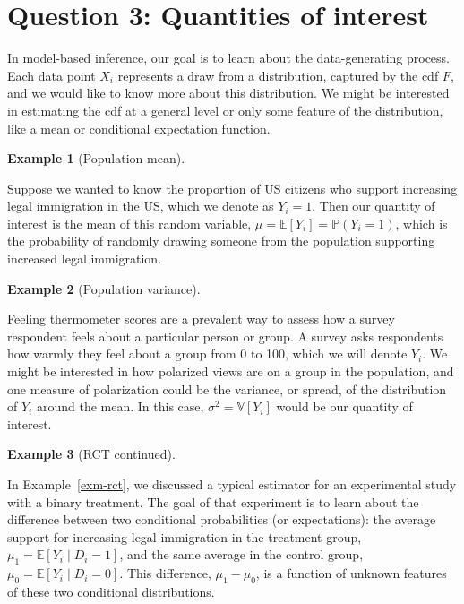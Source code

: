\documentclass[
  letterpaper,
  DIV=11,
  numbers=noendperiod]{scrreprt}
\newcommand{\E}{\mathbb{E}}
\newcommand{\V}{\mathbb{V}}
\renewcommand{\P}{\mathbb{P}}
\theoremstyle{definition}
\newtheorem{example}{Example}[chapter]
\theoremstyle{definition}
\theoremstyle{plain}
\theoremstyle{remark}
\begin{document}
\hypertarget{question-3-quantities-of-interest}{%
\section{Question 3: Quantities of
interest}\label{question-3-quantities-of-interest}}

In model-based inference, our goal is to learn about the data-generating
process. Each data point \(X_i\) represents a draw from a distribution,
captured by the cdf \(F\), and we would like to know more about this
distribution. We might be interested in estimating the cdf at a general
level or only some feature of the distribution, like a mean or
conditional expectation function.

\begin{example}[Population
mean]\protect\hypertarget{exm-prop}{}\label{exm-prop}

Suppose we wanted to know the proportion of US citizens who support
increasing legal immigration in the US, which we denote as \(Y_i = 1\).
Then our quantity of interest is the mean of this random variable,
\(\mu = \E[Y_i] = \P(Y_{i} = 1)\), which is the probability of randomly
drawing someone from the population supporting increased legal
immigration.

\end{example}

\begin{example}[Population
variance]\protect\hypertarget{exm-var}{}\label{exm-var}

Feeling thermometer scores are a prevalent way to assess how a survey
respondent feels about a particular person or group. A survey asks
respondents how warmly they feel about a group from 0 to 100, which we
will denote \(Y_i\). We might be interested in how polarized views are
on a group in the population, and one measure of polarization could be
the variance, or spread, of the distribution of \(Y_i\) around the mean.
In this case, \(\sigma^2 = \V[Y_i]\) would be our quantity of interest.

\end{example}

\begin{example}[RCT
continued]\protect\hypertarget{exm-rct-ii}{}\label{exm-rct-ii}

In Example~\ref{exm-rct}, we discussed a typical estimator for an
experimental study with a binary treatment. The goal of that experiment
is to learn about the difference between two conditional probabilities
(or expectations): the average support for increasing legal immigration
in the treatment group, \(\mu_1 = \E[Y_i \mid D_i = 1]\), and the same
average in the control group, \(\mu_0 = \E[Y_i \mid D_i = 0]\). This
difference, \(\mu_1 - \mu_0\), is a function of unknown features of
these two conditional distributions.

\end{example}
\end{document}
